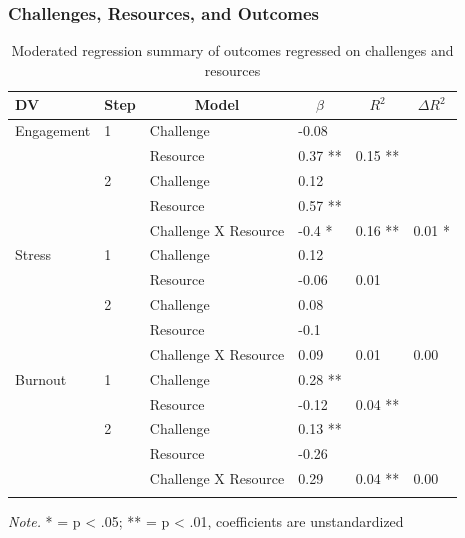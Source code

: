 \documentclass[
  man]{apa7}
\begin{document}
\subsubsection{Challenges, Resources, and Outcomes}\label{challenges-resources-and-outcomes}

\begin{table}[tbp]

\begin{center}
\begin{threeparttable}

\caption{\label{tab:chal-resource-table}Moderated regression summary of outcomes regressed on challenges and resources}

\begin{tabular}{llllll}
\toprule
DV & \multicolumn{1}{c}{Step} & \multicolumn{1}{c}{Model} & \multicolumn{1}{c}{$\beta$} & \multicolumn{1}{c}{$R^2$} & \multicolumn{1}{c}{$\Delta R^2$}\\
\midrule
Engagement & 1 & Challenge & -0.08 &  & \\
 &  & Resource & 0.37 ** & 0.15 ** & \\
 & 2 & Challenge & 0.12 &  & \\
 &  & Resource & 0.57 ** &  & \\
 &  & Challenge X Resource & -0.4 * & 0.16 ** & 0.01 *\\
Stress & 1 & Challenge & 0.12 &  & \\
 &  & Resource & -0.06 & 0.01 & \\
 & 2 & Challenge & 0.08 &  & \\
 &  & Resource & -0.1 &  & \\
 &  & Challenge X Resource & 0.09 & 0.01 & 0.00\\
Burnout & 1 & Challenge & 0.28 ** &  & \\
 &  & Resource & -0.12 & 0.04 ** & \\
 & 2 & Challenge & 0.13 ** &  & \\
 &  & Resource & -0.26 &  & \\
 &  & Challenge X Resource & 0.29 & 0.04 ** & 0.00\\
\bottomrule
\addlinespace
\end{tabular}

\begin{tablenotes}[para]
\normalsize{\textit{Note.} * = p < .05; ** = p < .01, coefficients are unstandardized}
\end{tablenotes}

\end{threeparttable}
\end{center}

\end{table}
\end{document}
